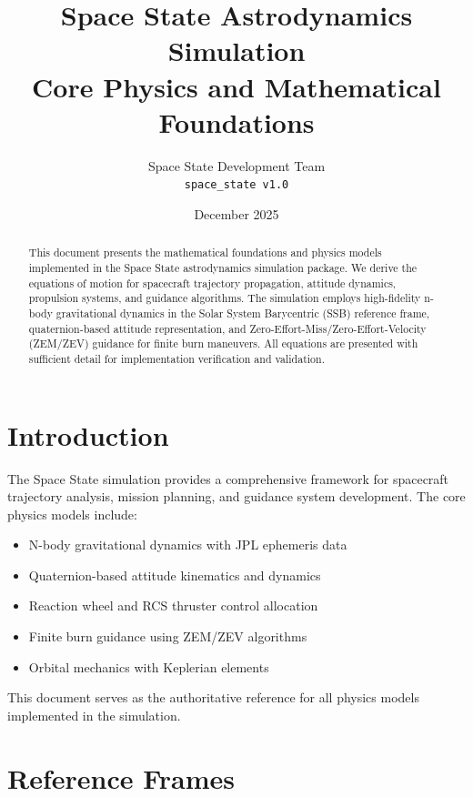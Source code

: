 \documentclass[11pt,a4paper]{article}
\title{%
    \textbf{Space State Astrodynamics Simulation} \\
    \large Core Physics and Mathematical Foundations
}
\author{%
    Space State Development Team \\
    \texttt{space\_state v1.0}
}
\date{December 2025}
\begin{document}
\maketitle

\begin{abstract}
This document presents the mathematical foundations and physics models implemented in the Space State astrodynamics simulation package. We derive the equations of motion for spacecraft trajectory propagation, attitude dynamics, propulsion systems, and guidance algorithms. The simulation employs high-fidelity n-body gravitational dynamics in the Solar System Barycentric (SSB) reference frame, quaternion-based attitude representation, and Zero-Effort-Miss/Zero-Effort-Velocity (ZEM/ZEV) guidance for finite burn maneuvers. All equations are presented with sufficient detail for implementation verification and validation.
\end{abstract}

\tableofcontents
\newpage

\section{Introduction}

The Space State simulation provides a comprehensive framework for spacecraft trajectory analysis, mission planning, and guidance system development. The core physics models include:

\begin{itemize}
    \item N-body gravitational dynamics with JPL ephemeris data
    \item Quaternion-based attitude kinematics and dynamics
    \item Reaction wheel and RCS thruster control allocation
    \item Finite burn guidance using ZEM/ZEV algorithms
    \item Orbital mechanics with Keplerian elements
\end{itemize}

This document serves as the authoritative reference for all physics models implemented in the simulation.

\section{Reference Frames}
\end{document}

